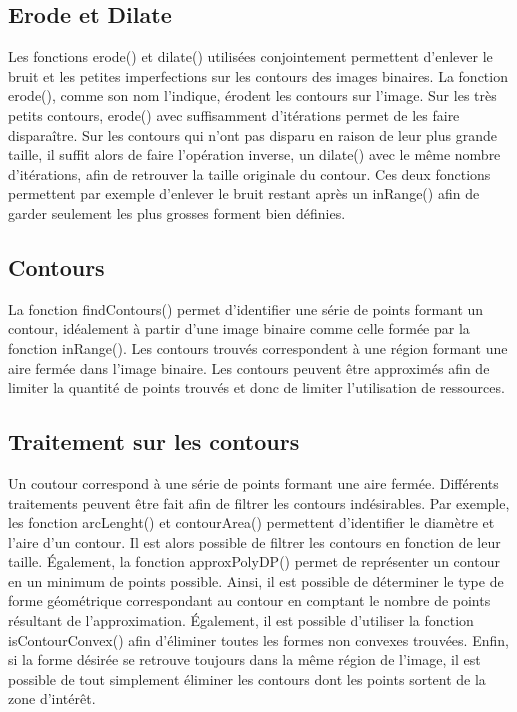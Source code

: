 \subsection{Erode et Dilate}

Les fonctions erode() et dilate() utilisées conjointement permettent d'enlever le bruit et les petites imperfections sur les contours des images binaires. La fonction erode(), comme son nom l'indique, érodent les contours sur l'image. Sur les très petits contours, erode() avec suffisamment d'itérations permet de les faire disparaître. Sur les contours qui n'ont pas disparu en raison de leur plus grande taille, il suffit alors de faire l'opération inverse, un dilate() avec le même nombre d'itérations, afin de retrouver la taille originale du contour. Ces deux fonctions permettent par exemple d'enlever le bruit restant après un inRange() afin de garder seulement les plus grosses forment bien définies.

\subsection{Contours}

La fonction findContours() permet d'identifier une série de points formant un contour, idéalement à partir d'une image binaire comme celle formée par la fonction inRange(). Les contours trouvés correspondent à une région formant une aire fermée dans l'image binaire. Les contours peuvent être approximés afin de limiter la quantité de points trouvés et donc de limiter l'utilisation de ressources.

\subsection{Traitement sur les contours}

Un coutour correspond à une série de points formant une aire fermée. Différents traitements peuvent être fait afin de filtrer les contours indésirables. Par exemple, les fonction arcLenght() et contourArea() permettent d'identifier le diamètre et l'aire d'un contour. Il est alors possible de filtrer les contours en fonction de leur taille. Également, la fonction approxPolyDP() permet de représenter un contour en un minimum de points possible. Ainsi, il est possible de déterminer le type de forme géométrique correspondant au contour en comptant le nombre de points résultant de l'approximation. Également, il est possible d'utiliser la fonction isContourConvex() afin d'éliminer toutes les formes non convexes trouvées. Enfin, si la forme désirée se retrouve toujours dans la même région de l'image, il est possible de tout simplement éliminer les contours dont les points sortent de la zone d'intérêt.
